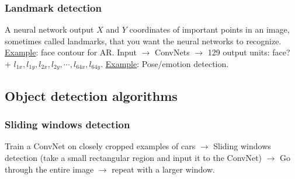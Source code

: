 \subsubsection{Landmark detection}
A neural network output $X$ and $Y$ coordinates of important points in an image, sometimes called landmarks, that you want the neural networks to recognize.\\
\underline{Example}: face contour for AR. Input $\rightarrow$ ConvNets $\rightarrow$ 129 output units: face? + $l_{1x}, l_{1y}, l_{2x}, l_{2y}, \cdots, l_{64x}, l_{64y}$.
\underline{Example}: Pose/emotion detection. 

%
\subsection{Object detection algorithms}

\subsubsection{Sliding windows detection}

Train a ConvNet on closely cropped examples of cars $\rightarrow$ Sliding windows detection (take a small rectangular region and input it to the ConvNet) $\rightarrow$ Go through the entire image $\rightarrow$ repeat with a larger window.
